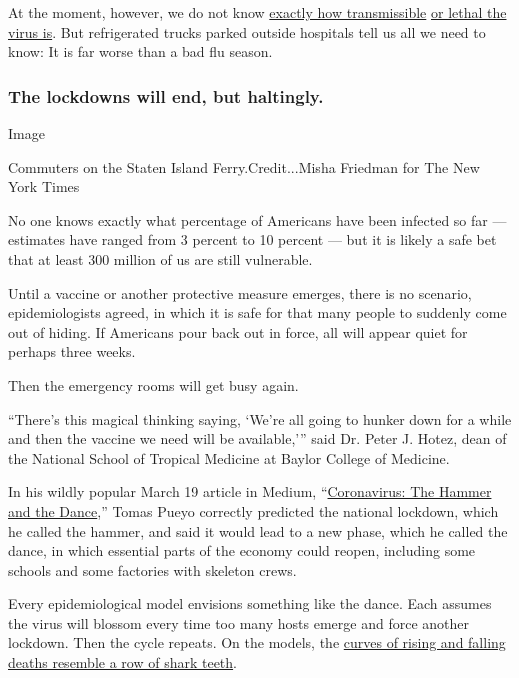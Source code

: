 At the moment, however, we do not know
\href{https://www.scmp.com/news/china/science/article/3079879/chinas-initial-coronavirus-outbreak-wuhan-spread-twice-fast-we}{exactly
how transmissible}
\href{https://www.nytimes.com/2020/04/17/us/coronavirus-death-rate.html}{or
lethal the virus is}. But refrigerated trucks parked outside hospitals
tell us all we need to know: It is far worse than a bad flu season.

\hypertarget{the-lockdowns-will-end-but-haltingly}{%
\subsubsection{The lockdowns will end, but
haltingly.}\label{the-lockdowns-will-end-but-haltingly}}

Image

Commuters on the Staten Island Ferry.Credit...Misha Friedman for The New
York Times

No one knows exactly what percentage of Americans have been infected so
far --- estimates have ranged from 3 percent to 10 percent --- but it is
likely a safe bet that at least 300 million of us are still vulnerable.

Until a vaccine or another protective measure emerges, there is no
scenario, epidemiologists agreed, in which it is safe for that many
people to suddenly come out of hiding. If Americans pour back out in
force, all will appear quiet for perhaps three weeks.

Then the emergency rooms will get busy again.

``There's this magical thinking saying, `We're all going to hunker down
for a while and then the vaccine we need will be available,''' said Dr.
Peter J. Hotez, dean of the National School of Tropical Medicine at
Baylor College of Medicine.

In his wildly popular March 19 article in Medium,
``\href{https://medium.com/@tomaspueyo/coronavirus-the-hammer-and-the-dance-be9337092b56}{Coronavirus:
The Hammer and the Dance},'' Tomas Pueyo correctly predicted the
national lockdown, which he called the hammer, and said it would lead to
a new phase, which he called the dance, in which essential parts of the
economy could reopen, including some schools and some factories with
skeleton crews.

Every epidemiological model envisions something like the dance. Each
assumes the virus will blossom every time too many hosts emerge and
force another lockdown. Then the cycle repeats. On the models, the
\href{https://www.imperial.ac.uk/media/imperial-college/medicine/sph/ide/gida-fellowships/Imperial-College-COVID19-NPI-modelling-16-03-2020.pdf}{curves
of rising and falling deaths resemble a row of shark teeth}.

